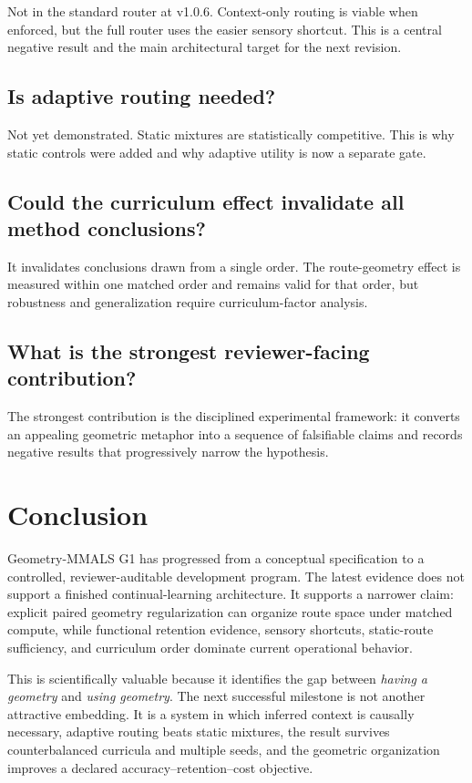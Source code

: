 \documentclass[11pt,a4paper]{article}
\begin{document}
Not in the standard router at v1.0.6. Context-only routing is viable when enforced, but the full router uses the easier sensory shortcut. This is a central negative result and the main architectural target for the next revision.

\subsection*{Is adaptive routing needed?}

Not yet demonstrated. Static mixtures are statistically competitive. This is why static controls were added and why adaptive utility is now a separate gate.

\subsection*{Could the curriculum effect invalidate all method conclusions?}

It invalidates conclusions drawn from a single order. The route-geometry effect is measured within one matched order and remains valid for that order, but robustness and generalization require curriculum-factor analysis.

\subsection*{What is the strongest reviewer-facing contribution?}

The strongest contribution is the disciplined experimental framework: it converts an appealing geometric metaphor into a sequence of falsifiable claims and records negative results that progressively narrow the hypothesis.

\section{Conclusion}

Geometry-MMALS G1 has progressed from a conceptual specification to a controlled, reviewer-auditable development program. The latest evidence does not support a finished continual-learning architecture. It supports a narrower claim: explicit paired geometry regularization can organize route space under matched compute, while functional retention evidence, sensory shortcuts, static-route sufficiency, and curriculum order dominate current operational behavior.

This is scientifically valuable because it identifies the gap between \emph{having a geometry} and \emph{using geometry}. The next successful milestone is not another attractive embedding. It is a system in which inferred context is causally necessary, adaptive routing beats static mixtures, the result survives counterbalanced curricula and multiple seeds, and the geometric organization improves a declared accuracy--retention--cost objective.
\end{document}
